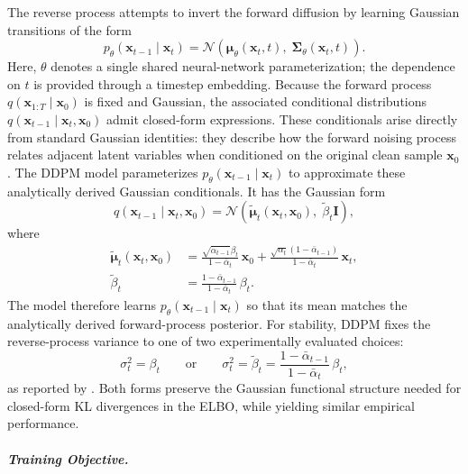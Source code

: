 The reverse process attempts to invert the forward diffusion by learning Gaussian transitions of the
form
\begin{equation}
p_\theta(\mathbf{x}_{t-1}\mid\mathbf{x}_t)
=
\mathcal{N}\!\left(
\boldsymbol{\mu}_\theta(\mathbf{x}_t,t),\;
\boldsymbol{\Sigma}_\theta(\mathbf{x}_t,t)
\right).
\label{eq:ddpm_reverse}
\end{equation}
Here, \(\theta\) denotes a single shared neural-network parameterization; the dependence on \(t\) is
provided through a timestep embedding. Because the forward process $q(\mathbf{x}_{1:T}\mid\mathbf{x}_0)$ is fixed and Gaussian, the
associated conditional distributions $q(\mathbf{x}_{t-1}\mid\mathbf{x}_t,\mathbf{x}_0)$ admit
closed-form expressions. These conditionals arise directly from standard Gaussian identities:
they describe how the forward noising process relates adjacent latent variables when conditioned
on the original clean sample $\mathbf{x}_0$. The DDPM model parameterizes
$p_\theta(\mathbf{x}_{t-1}\mid\mathbf{x}_t)$ to approximate these analytically derived
Gaussian conditionals.
It has the Gaussian form
\begin{equation}
q(\mathbf{x}_{t-1}\mid\mathbf{x}_t,\mathbf{x}_0)
=
\mathcal{N}\!\left(
\tilde{\boldsymbol{\mu}}_t(\mathbf{x}_t,\mathbf{x}_0),\;
\tilde{\beta}_t \mathbf{I}
\right),
\label{eq:true_reverse_posterior}
\end{equation}
where
\begin{align}
\tilde{\boldsymbol{\mu}}_t(\mathbf{x}_t,\mathbf{x}_0)
&=
\frac{\sqrt{\bar\alpha_{t-1}}\beta_t}{1-\bar\alpha_t}\,\mathbf{x}_0
+
\frac{\sqrt{\alpha_t}(1-\bar\alpha_{t-1})}{1-\bar\alpha_t}\,\mathbf{x}_t,
\\[4pt]
\tilde{\beta}_t
&=
\frac{1-\bar\alpha_{t-1}}{1-\bar\alpha_t}\,\beta_t.
\end{align}
The model therefore learns $p_\theta(\mathbf{x}_{t-1}\mid\mathbf{x}_t)$ so that its mean matches
the analytically derived forward-process posterior. For stability, DDPM fixes the reverse-process
variance to one of two experimentally evaluated choices:
\[
\sigma_t^2 = \beta_t
\qquad\text{or}\qquad
\sigma_t^2 = \tilde{\beta}_t = \frac{1-\bar{\alpha}_{t-1}}{1-\bar{\alpha}_t}\,\beta_t,
\]
as reported by \citet{NEURIPS2020_4c5bcfec}. Both forms preserve the Gaussian functional structure
needed for closed-form KL divergences in the ELBO, while yielding similar empirical performance.


\subparagraph{Training Objective.}

